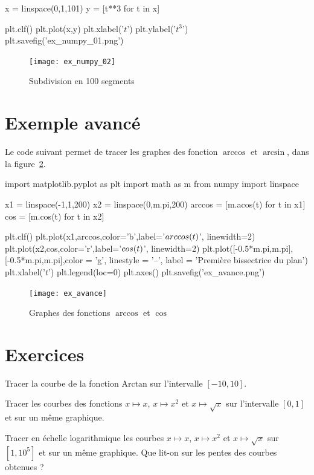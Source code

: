 \begin{ex}
\begin{pyverbatim}
x = linspace(0,1,101)
y = [t**3 for t in x]

plt.clf()
plt.plot(x,y)
plt.xlabel('$t$')
plt.ylabel('$t^3$')
plt.savefig('ex_numpy_01.png')
\end{pyverbatim}

\begin{figure}[!h]
  \begin{center}
    \texttt{[image: ex\_numpy\_02]}
    \caption{Subdivision en 100 segments}
    \label{fig:ex_numpy_02}
  \end{center}
\end{figure}  
\end{ex}


\section{Exemple avancé}

Le code suivant permet de tracer les graphes des fonction $\arccos$ et $\arcsin$, dans la figure~\ref{fig:ex_avance}.
\begin{pyverbatim}
import matplotlib.pyplot as plt
import math as m
from numpy import linspace

x1 = linspace(-1,1,200)
x2 = linspace(0,m.pi,200)
arccos = [m.acos(t) for t in x1]
cos = [m.cos(t) for t in x2]

plt.clf()
plt.plot(x1,arccos,color='b',label='$\\arccos(t)$', linewidth=2)
plt.plot(x2,cos,color='r',label='$\\cos(t)$', linewidth=2)
plt.plot([-0.5*m.pi,m.pi],[-0.5*m.pi,m.pi],color = 'g', 
  linestyle = '--', label = 'Première bissectrice du plan')
plt.xlabel('$t$')
plt.legend(loc=0)
plt.axes()
plt.savefig('ex_avance.png')
\end{pyverbatim}

\begin{figure}[!h]
  \begin{center}
    \texttt{[image: ex\_avance]}
    \caption{Graphes des fonctions $\arccos$ et $\cos$}
    \label{fig:ex_avance}
  \end{center}
\end{figure}  

\section{Exercices}

  Tracer la courbe de la fonction $\mathrm{Arctan}$ sur l'intervalle $[-10,10]$. 

  Tracer les courbes des fonctions $x\mapsto x$, $x\mapsto x^2$ et $x\mapsto \sqrt{x}$ sur l'intervalle $[0,1]$ et sur un même graphique. 

  Tracer en échelle logarithmique les courbes $x \mapsto x$, $x \mapsto x^2$ et $x\mapsto \sqrt{x}$ sur $[1,10^5]$ et sur un même graphique. 
  Que lit-on sur les pentes des courbes obtenues ? 
